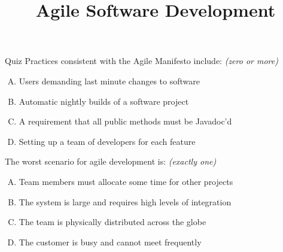 \documentclass{beamer}
\title{Agile Software Development}
\date{}
\begin{document}
\begin{frame}
\titlepage
\end{frame}

\begin{frame}{Quiz}
Practices consistent with the Agile Manifesto include: \hfill \textit{(zero or more)}
\begin{enumerate}[(A)]
\item<1-2> Users demanding last minute changes to software
\item<1-2> Automatic nightly builds of a software project
\item<1> A requirement that all public methods must be Javadoc'd
\item<1> Setting up a team of developers for each feature
\end{enumerate}
\medskip
The worst scenario for agile development is:  \hfill \textit{(exactly one)}
\begin{enumerate}[(A)]
\item<1> Team members must allocate some time for other projects
\item<1> The system is large and requires high levels of integration
\item<1> The team is physically distributed across the globe
\item<1-2> The customer is busy and cannot meet frequently
\end{enumerate}
\end{frame}
\end{document}
